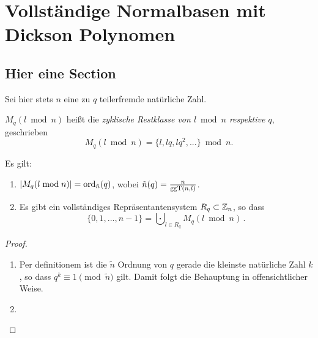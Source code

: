
\chapter{Vollständige Normalbasen mit Dickson Polynomen}

\section{Hier eine Section}

Sei hier stets $n$ eine zu $q$ teilerfremde natürliche Zahl.

\begin{notation}
  $M_q(l\bmod n)$ heißt die \emph{zyklische Restklasse von $l\bmod n$ respektive
  $q$}, geschrieben
  \[ M_q(l\bmod n) = \{l,lq,lq^2,...\} \bmod n.\]
\end{notation}


\begin{lemma}
  Es gilt:
  \begin{enumerate}
    \item $| M_q(l\bmod n)| = \operatorname{ord}_{\tilde n}(q)$, 
      wobei $\tilde n(q) = \tfrac{n}{\operatorname{ggT}(n,l)}$.
    \item Es gibt ein vollständiges Repräsentantensystem $R_q \subset \mathbb{Z}_n$, so
      dass 
      \[ \{0,1,...,n-1\} = \bigcupdot_{l\in R_q} M_q(l \bmod n) \,.\]
  \end{enumerate}
\end{lemma}
\begin{proof}
  \begin{enumerate}
    \item Per definitionem ist die $\tilde n$ Ordnung von $q$ gerade die
      kleinste natürliche Zahl $k$, so dass $q^k \equiv 1 \pmod{\tilde n}$ gilt.
      Damit folgt die Behauptung in offensichtlicher Weise.
    \item 
  \end{enumerate}
\end{proof}

